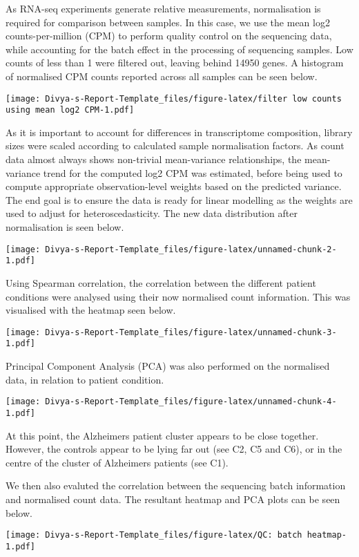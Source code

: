 \documentclass[
]{article}
\begin{document}
As RNA-seq experiments generate relative measurements, normalisation is
required for comparison between samples. In this case, we use the mean
log2 counts-per-million (CPM) to perform quality control on the
sequencing data, while accounting for the batch effect in the processing
of sequencing samples. Low counts of less than 1 were filtered out,
leaving behind 14950 genes. A histogram of normalised CPM counts
reported across all samples can be seen below.

\texttt{[image: Divya-s-Report-Template\_files/figure-latex/filter low counts using mean log2 CPM-1.pdf]}

As it is important to account for differences in transcriptome
composition, library sizes were scaled according to calculated sample
normalisation factors. As count data almost always shows non-trivial
mean-variance relationships, the mean-variance trend for the computed
log2 CPM was estimated, before being used to compute appropriate
observation-level weights based on the predicted variance. The end goal
is to ensure the data is ready for linear modelling as the weights are
used to adjust for heteroscedasticity. The new data distribution after
normalisation is seen below.

\texttt{[image: Divya-s-Report-Template\_files/figure-latex/unnamed-chunk-2-1.pdf]}

Using Spearman correlation, the correlation between the different
patient conditions were analysed using their now normalised count
information. This was visualised with the heatmap seen below.

\texttt{[image: Divya-s-Report-Template\_files/figure-latex/unnamed-chunk-3-1.pdf]}

Principal Component Analysis (PCA) was also performed on the normalised
data, in relation to patient condition.

\texttt{[image: Divya-s-Report-Template\_files/figure-latex/unnamed-chunk-4-1.pdf]}

At this point, the Alzheimers patient cluster appears to be close
together. However, the controls appear to be lying far out (see C2, C5
and C6), or in the centre of the cluster of Alzheimers patients (see
C1).

We then also evaluted the correlation between the sequencing batch
information and normalised count data. The resultant heatmap and PCA
plots can be seen below.

\texttt{[image: Divya-s-Report-Template\_files/figure-latex/QC: batch heatmap-1.pdf]}
\end{document}
